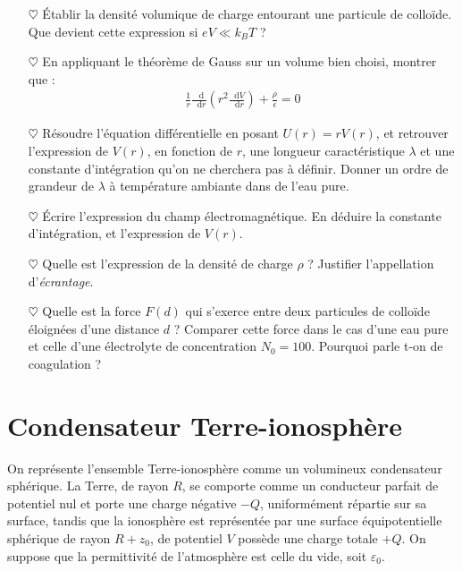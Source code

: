 \documentclass{report}
\newcommand*\dif{\mathop{}\!\mathrm{d}}
\begin{document}
\begin{itemize}

	\item[$\heartsuit$] Établir la densité volumique de charge entourant une particule de colloïde. Que devient cette expression si $eV\ll k_BT$ ?
	
	\item[$\heartsuit$] En appliquant le théorème de Gauss sur un volume bien choisi, montrer que : 
	\begin{align*}
		\frac{1}{r}\frac{\dif}{\dif r}\left( r^2\frac{\dif V}{\dif r}\right) +\frac{\rho}{\epsilon}=0
	\end{align*}

	\item[$\heartsuit$] Résoudre l'équation différentielle en posant $U(r)=rV(r)$, et retrouver l'expression de $V(r)$, en fonction de $r$, une longueur caractéristique $\lambda$ et une constante d'intégration qu'on ne cherchera pas à définir. Donner un ordre de grandeur de $\lambda$ à température ambiante dans de l'eau pure.
	
	\item[$\heartsuit$] Écrire l'expression du champ électromagnétique. En déduire la constante d'intégration, et l'expression de $V(r)$. 
	
	\item[$\heartsuit$] Quelle est l'expression de la densité de charge $\rho$ ? Justifier l'appellation d'\textit{écrantage}.
	
	\item[$\heartsuit$] Quelle est la force $F(d)$ qui s'exerce entre deux particules de colloïde éloignées d'une distance $d$ ? Comparer cette force dans le cas d'une eau pure et celle d'une électrolyte de concentration $N_0=100$. Pourquoi parle t-on de coagulation ?

\end{itemize} 

\newpage

\section*{Condensateur Terre-ionosphère}

On représente l'ensemble Terre-ionosphère comme un volumineux condensateur sphérique. La Terre, de rayon $R$, se comporte comme un conducteur parfait de potentiel nul et porte une charge négative $-Q$, uniformément répartie sur sa surface, tandis que la ionosphère est représentée par une surface équipotentielle sphérique de rayon $R+z_0$, de potentiel $V$ possède une charge totale $+Q$. On suppose que la permittivité de l'atmosphère est celle du vide, soit $\varepsilon_0$. 
\end{document}
